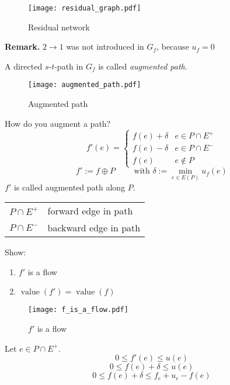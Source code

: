 \documentclass{article}
\newcommand{\gath}[2]{$#1$-$#2$-path} %
\begin{document}
\begin{figure}[h]
 \begin{center}
  \texttt{[image: residual\_graph.pdf]}
  \caption{Residual network}
 \end{center}
\end{figure}

\textbf{Remark.} $2\rightarrow 1$ was not introduced in $G_f$, because $u_f = 0$

A directed \gath st in $G_f$ is called \emph{augmented path}.

\begin{figure}[h]
 \begin{center}
  \texttt{[image: augmented\_path.pdf]}
  \caption{Augmented path}
 \end{center}
\end{figure}

How do you augment a path?
\[
  f'(e) = \left\{\begin{array}{lc}
    f(e) + \delta  & e \in P \cap E^+ \\
    f(e) - \delta  & e \in P \cap E^- \\
    f(e)           & e \notin P
  \end{array}\right.
\] \[
  f' := f \oplus P \qquad \text{ with } \delta := \min_{e \in E(P)} {u_f(e)}
\]
$f'$ is called augmented path along $P$.

\begin{center}
 \begin{tabular}{cl}
  $P \cap E^+$ & forward edge in path \\
  $P \cap E^-$ & backward edge in path
 \end{tabular}
\end{center}

Show:
\begin{enumerate}
  \item $f'$ is a flow
  \item $\operatorname{value}(f') = \operatorname{value}(f)$
\end{enumerate}

\begin{figure}[h]
 \begin{center}
  \texttt{[image: f\_is\_a\_flow.pdf]}
  \caption{$f'$ is a flow}
 \end{center}
\end{figure}

Let $e \in P \cap E^+$.
\[
  0 \leq f'(e) \leq u(e)
\] \[
  0 \leq f(e) + \delta \leq u(e)
\] \[
  0 \leq f(e) + \delta \leq f_e + u_e - f(e)
\]
\end{document}
